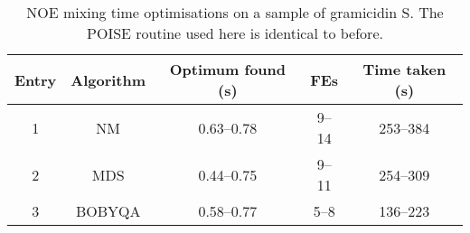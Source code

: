 \begin{table}[htb]
    \centering
    \begin{tabular}{ccccc}
        \toprule
        Entry & Algorithm & Optimum found (\si{\s}) & FEs    & Time taken (\si{\s}) \\
        \midrule
        1     & NM        & 0.63--0.78              & 9--14  & 253--384             \\
        2     & MDS       & 0.44--0.75              & 9--11  & 254--309             \\
        3     & BOBYQA    & 0.58--0.77              & 5--8   & 136--223             \\
        \bottomrule
    \end{tabular}
    \caption[NOE mixing time optimisations on gramicidin]{
        NOE mixing time optimisations on a sample of gramicidin S.
        The POISE routine used here is identical to before.
    }
    \label{tbl:poise_noe_grami}
\end{table}
